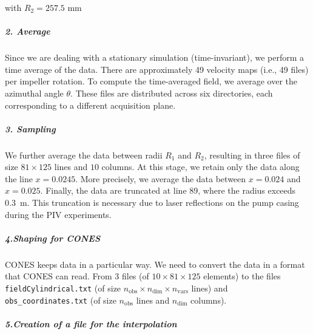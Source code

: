 with $R_{2} = 257.5$ mm

\subparagraph{2. Average}

Since we are dealing with a stationary simulation (time-invariant), we perform a time average of the data.
There are approximately 49 velocity maps (i.e., 49 files) per impeller rotation. To compute the time-averaged field, we average over the azimuthal angle \(\theta\).%
These files are distributed across six directories, each corresponding to a different acquisition plane.


\subparagraph{3. Sampling}

We further average the data between radii \(R_1\) and \(R_2\), resulting in three files of size $81 \times 125$ lines and $10$ columns.
At this stage, we retain only the data along the line \(x = 0.0245\). More precisely, we average the data between \(x = 0.024\) and \(x = 0.025\).
Finally, the data are truncated at line 89, where the radius exceeds 0.3~m. This truncation is necessary due to laser reflections on the pump casing during the PIV experiments.%


\subparagraph{4.Shaping for CONES}
CONES keeps data in a particular way. We need to convert the data in a format that CONES can read.
From 3 files (of $10 \times 81 \times 125$ elements) to the files 
\texttt{fieldCylindrical.txt} (of size $n_{\text{obs}} \times n_{\text{dim}} \times n_{\text{vars}}$ lines) 
and \texttt{obs\_coordinates.txt} (of size $n_{\text{obs}}$ lines and $n_{\text{dim}}$ columns).

\subparagraph{5.Creation of a file for the interpolation}

